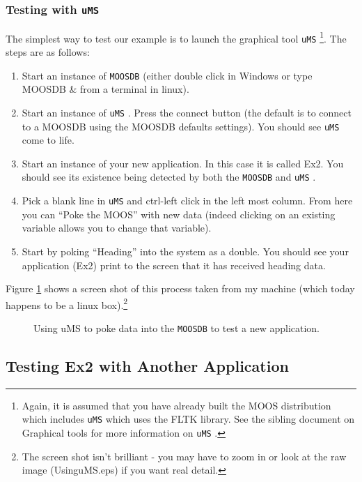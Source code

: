 \documentclass[a4paper,10pt]{article}
\newcommand{\Code}[1]{\texttt{#1} }
\newcommand{\code}[1]{\Code{#1} }
\begin{document}
\subsubsection{Testing with \code{uMS}} \label{Sec:UsinguMS}

The simplest way to test our example is to launch the graphical tool \code{uMS}\footnote{Again, it is assumed that you have already built the MOOS distribution which includes \code{uMS} which uses the FLTK library. See the sibling document on Graphical tools for more information on \code{uMS}.}. The steps are as follows:

\begin{enumerate}
\item Start an instance of \code{MOOSDB} (either double click in Windows or type MOOSDB \&  from a terminal in linux).
\item Start an instance of \code{uMS}. Press the connect button (the default is to connect to a MOOSDB using the MOOSDB defaults settings). You should see \code{uMS} come to life.
\item Start an instance of your new application. In this case it is called Ex2. You should see its existence being detected by both the \code{MOOSDB} and \code{uMS}.
\item Pick a blank line in \code{uMS} and ctrl-left click in the left most column. From here you can ``Poke the MOOS'' with new data (indeed clicking on an existing variable allows you to change that variable).
\item Start by poking ``Heading'' into the system as a double. You should see your application (Ex2) print to the screen that it has received heading data.
\end{enumerate}

Figure \ref{Fig:UsinguMS} shows a screen shot of this process taken from my machine (which today happens to be a linux box).\footnote{ The screen shot isn't brilliant  - you may have to zoom in or look at the raw image (UsinguMS.eps) if you want real detail.}

\begin{figure}\label{Fig:UsinguMS}
\centering
{}
\caption{Using uMS to poke data into the \code{MOOSDB} to test a new application.}
\end{figure}

\subsection{Testing Ex2 with Another Application}\label{Sec:VehicleSimulator}
\end{document}
